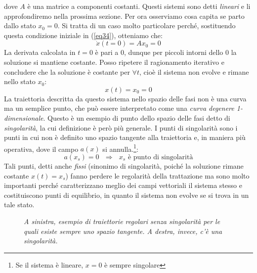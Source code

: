 \documentclass[a4paper,openany]{article}
\begin{document}
	dove $A$ è una matrice a componenti costanti. Questi sistemi sono detti \textit{lineari} e li approfondiremo nella prossima sezione. Per ora osserviamo cosa capita se parto dallo stato $x_{0} = 0$. Si tratta di un caso molto particolare perché, sostituendo questa condizione iniziale in (\ref{eq34}), otteniamo che:
	$$
	\dot{x}(t=0) = Ax_{0} = 0
	$$
	La derivata calcolata in $t=0$ è pari a 0, dunque per piccoli intorni dello $0$ la soluzione si mantiene costante. Posso ripetere il ragionamento iterativo e concludere che la soluzione è costante per $\forall t$, cioè il sistema non evolve e rimane nello stato $x_{0}$:
	$$
	x(t) = x_{0} = 0
	$$
	La traiettoria descritta da questo sistema nello spazio delle fasi non è una curva ma un semplice punto, che può essere interpretato come una \textit{curva degenere 1-dimensionale}. 
	Questo è un esempio di punto dello spazio delle fasi detto di \textit{singolarità}, la cui definizione è però più generale. I punti di singolarità sono i punti in cui non è definito uno spazio tangente alla traiettoria e, in maniera più operativa, dove il campo $a(x)$ si annulla.\footnote{Se il sistema è lineare, $x=0$ è sempre singolare}:
	$$
	a(x_{s}) = 0 \>\>\> \Longrightarrow \mbox{ $x_{s}$ è punto di singolarità}
	$$
	Tali punti, detti anche \textit{fissi} (sinonimo di singolarità, poiché la soluzione rimane costante $x(t) = x_{s}$) fanno perdere le regolarità della trattazione ma sono molto importanti perché caratterizzano meglio dei campi vettoriali il sistema stesso e costituiscono punti di equilibrio, in quanto il sistema non evolve se si trova in un tale stato.
	\begin{figure}[H]
		\centering
		\caption{\textit{A sinistra, esempio di traiettorie regolari senza singolarità per le quali esiste sempre uno spazio tangente. A destra, invece, c'è una singolarità.}}
		\label{FigSingolarità}
	\end{figure}
\end{document}
